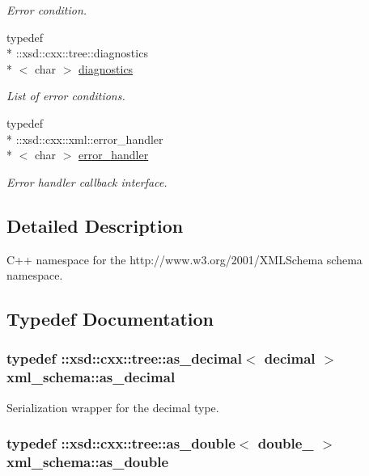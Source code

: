 \begin{DoxyCompactItemize}
\begin{DoxyCompactList}\small\item\em Error condition. \end{DoxyCompactList}\item 
typedef \\*
\-::xsd\-::cxx\-::tree\-::diagnostics\\*
$<$ char $>$ \hyperlink{namespacexml__schema_a62cc106990ec99fdaf2f3364d98cfabd}{diagnostics}
\begin{DoxyCompactList}\small\item\em List of error conditions. \end{DoxyCompactList}\item 
typedef \\*
\-::xsd\-::cxx\-::xml\-::error\-\_\-handler\\*
$<$ char $>$ \hyperlink{namespacexml__schema_abdee01986b8e16f04af47dd12038261e}{error\-\_\-handler}
\begin{DoxyCompactList}\small\item\em Error handler callback interface. \end{DoxyCompactList}\end{DoxyCompactItemize}


\subsection{Detailed Description}
C++ namespace for the http\-://www.w3.\-org/2001/\-X\-M\-L\-Schema schema namespace. 

\subsection{Typedef Documentation}
\hypertarget{namespacexml__schema_a60dfdca63dedf12d8a524c0496def693}{
\subsubsection[{as\-\_\-decimal}]{\setlength{\rightskip}{0pt plus 5cm}typedef \-::xsd\-::cxx\-::tree\-::as\-\_\-decimal$<$ {\bf decimal} $>$ {\bf xml\-\_\-schema\-::as\-\_\-decimal}}}\label{namespacexml__schema_a60dfdca63dedf12d8a524c0496def693}


Serialization wrapper for the decimal type. 

\hypertarget{namespacexml__schema_ae0eab1db5641db3b286a63a0ebe40351}{
\subsubsection[{as\-\_\-double}]{\setlength{\rightskip}{0pt plus 5cm}typedef \-::xsd\-::cxx\-::tree\-::as\-\_\-double$<$ {\bf double\-\_\-} $>$ {\bf xml\-\_\-schema\-::as\-\_\-double}}}\label{namespacexml__schema_ae0eab1db5641db3b286a63a0ebe40351}


